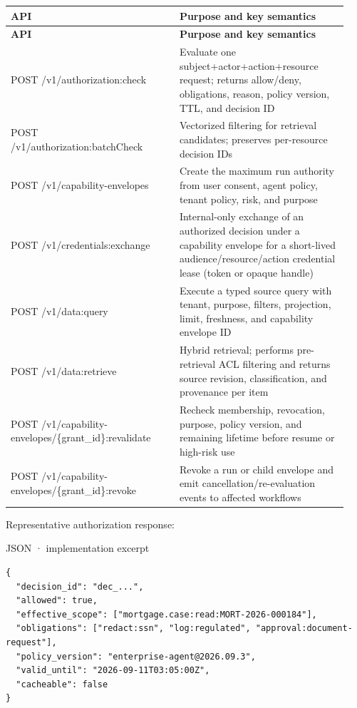 \BookTableStart
\small
\begin{longtable}{@{}Y{0.4700\linewidth}Y{0.4700\linewidth}@{}}
\color{white}\bfseries \textbf{API} & \color{white}\bfseries \textbf{Purpose and key semantics} \\
\endfirsthead
{}
\color{white}\bfseries \textbf{API} & \color{white}\bfseries \textbf{Purpose and key semantics} \\
\endhead
POST /v1/authorization:check & Evaluate one subject+actor+action+resource request; returns allow/deny, obligations, reason, policy version, TTL, and decision ID \\
POST /v1/authorization:batchCheck & Vectorized filtering for retrieval candidates; preserves per-resource decision IDs \\
POST /v1/capability-envelopes & Create the maximum run authority from user consent, agent policy, tenant policy, risk, and purpose \\
POST /v1/credentials:exchange & Internal-only exchange of an authorized decision under a capability envelope for a short-lived audience/resource/action credential lease (token or opaque handle) \\
POST /v1/data:query & Execute a typed source query with tenant, purpose, filters, projection, limit, freshness, and capability envelope ID \\
POST /v1/data:retrieve & Hybrid retrieval; performs pre-retrieval ACL filtering and returns source revision, classification, and provenance per item \\
POST /v1/capability-envelopes/\{grant\_id\}:revalidate & Recheck membership, revocation, purpose, policy version, and remaining lifetime before resume or high-risk use \\
POST /v1/capability-envelopes/\{grant\_id\}:revoke & Revoke a run or child envelope and emit cancellation/re-evaluation events to affected workflows \\
\end{longtable}
\BookTableEnd

Representative authorization response:\par

JSON · implementation excerpt\par

\needspace{102.8pt}
\begin{lstlisting}[style=bookcode,title={JSON},language=bookjson]
{
  "decision_id": "dec_...",
  "allowed": true,
  "effective_scope": ["mortgage.case:read:MORT-2026-000184"],
  "obligations": ["redact:ssn", "log:regulated", "approval:document-request"],
  "policy_version": "enterprise-agent@2026.09.3",
  "valid_until": "2026-09-11T03:05:00Z",
  "cacheable": false
}
\end{lstlisting}

